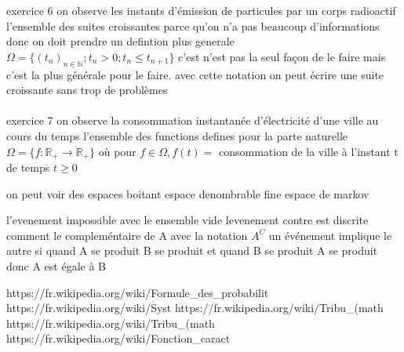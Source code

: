 \documentclass{article}
\begin{document}
exercice 6
on observe les instants d'émission de particules par un corps radioactif
l'ensemble des suites croissantes parce qu'on n'a pas beaucoup d'informations donc on doit prendre un defintion plus generale
$\Omega = \{ (t_{n})_{n \in \mathbb{N}} ; t_{n} > 0 ; t_{n} \leq t_{n+1}\}$
c'est n'est pas la seul façon de le faire mais c'est la plus générale pour le faire. avec cette notation on peut écrire une suite croissante sans trop de problèmes
\\\\

exercice 7
on observe la consommation instantanée d'électricité d'une ville au cours du temps
l'ensemble des functions defines pour la parte naturelle
$\Omega = \{ f : \mathbb{R}_{+} \to \mathbb{R}_{+} \}$ où pour $f \in \Omega, f(t) =$ consommation de la ville à l'instant t de temps $t\geq 0$

on peut voir des espaces boitant espace denombrable fine
espace de markov

l'evenement impossible avec le ensemble vide
levenement contre est discrite comment le compleméntaire de A avec la notation $A^{C}$
un événement implique le autre si quand A se produit B se produit et quand B se produit A se produit donc A est égale à B

https://fr.wikipedia.org/wiki/Formule_des_probabilit%
https://fr.wikipedia.org/wiki/Syst%
https://fr.wikipedia.org/wiki/Tribu_(math%
https://fr.wikipedia.org/wiki/Tribu_(math%
https://fr.wikipedia.org/wiki/Fonction_caract%
\end{document}
